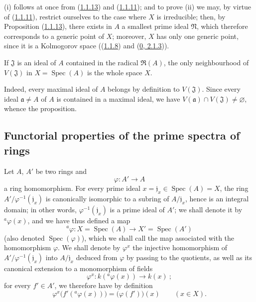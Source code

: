 (i) follows at once from (\hyperref[I.1.1.13]{1.1.13}) and
(\hyperref[I.1.1.11]{1.1.11}); and to prove (ii) we may, by virtue of
(\hyperref[I.1.1.11]{1.1.11}), restrict ourselves to the case where $X$ is
irreducible; then, by Proposition (\hyperref[I.1.1.13]{1.1.13}), there
exists in $A$ a smallest prime ideal $\mathfrak{N}$, which therefore
corresponds to a generic point
of $X$; moreover, $X$ has only one generic point, since it is a
Kolmogorov space ((\hyperref[I.1.1.8]{1.1.8}) and
(\hyperref[0.2.1.3]{0, 2.1.3})).

\begin{proposition}[1.1.15]
\label{I.1.1.15}
If $\mathfrak{J}$ is an ideal of $A$ contained in the radical
$\mathfrak{R}(A)$, the only neighbourhood of $V(\mathfrak{J})$ in
$X=\operatorname{Spec}(A)$ is the whole space $X$.
\end{proposition}

Indeed, every maximal ideal of $A$ belongs by definition to
$V(\mathfrak{J})$. Since every ideal $\mathfrak{a}\neq A$ of $A$ is contained
in a maximal ideal, we have $V(\mathfrak{a})\cap V(\mathfrak{J})\neq\varnothing$,
whence the proposition.

\subsection{Functorial properties of the prime spectra of rings}
\label{subsection:I.1.2}

\begin{env}[1.2.1]
\label{I.1.2.1}
Let $A$, $A'$ be two rings and
\[
  \varphi:A'\longrightarrow A
\]
a ring homomorphism. For every prime ideal
$x=\mathfrak{j}_x\in\operatorname{Spec}(A)=X$, the ring
$A'/\varphi^{-1}(\mathfrak{j}_x)$ is canonically isomorphic to a
subring of $A/\mathfrak{j}_x$, hence is an integral domain; in other words,
$\varphi^{-1}(\mathfrak{j}_x)$ is a prime ideal of $A'$; we shall
denote it by ${}^a\varphi(x)$, and we have thus defined a map
\[
  {}^a\varphi:X=\operatorname{Spec}(A)\longrightarrow
  X'=\operatorname{Spec}(A')
\]
(also denoted $\operatorname{Spec}(\varphi)$), which we shall call the map
associated with the homomorphism $\varphi$. We shall denote by
$\varphi^x$ the injective homomorphism of
$A'/\varphi^{-1}(\mathfrak{j}_x)$ into $A/\mathfrak{j}_x$ deduced from
$\varphi$ by passing to the quotients, as well as its canonical extension to
a monomorphism of fields
\[
  \varphi^x:k({}^a\varphi(x))\longrightarrow k(x)~;
\]
for every $f'\in A'$, we therefore have by definition
\begin{equation}
  \varphi^x\bigl(f'({}^a\varphi(x))\bigr)=\bigl(\varphi(f')\bigr)(x)
  \qquad(x\in X).
  \tag{1.2.1.1}\label{I.1.2.1.1}
\end{equation}
\end{env}

